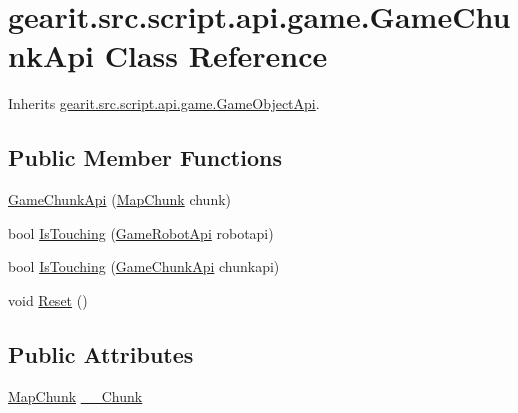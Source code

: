 \hypertarget{classgearit_1_1src_1_1script_1_1api_1_1game_1_1_game_chunk_api}{\section{gearit.\+src.\+script.\+api.\+game.\+Game\+Chunk\+Api Class Reference}
\label{classgearit_1_1src_1_1script_1_1api_1_1game_1_1_game_chunk_api}
}


Inherits \hyperlink{classgearit_1_1src_1_1script_1_1api_1_1game_1_1_game_object_api}{gearit.\+src.\+script.\+api.\+game.\+Game\+Object\+Api}.

\subsection*{Public Member Functions}
\begin{DoxyCompactItemize}
\item 
\hyperlink{classgearit_1_1src_1_1script_1_1api_1_1game_1_1_game_chunk_api_a205987f87ffa1c32e7c16c9f588b861d}{Game\+Chunk\+Api} (\hyperlink{classgearit_1_1src_1_1editor_1_1map_1_1_map_chunk}{Map\+Chunk} chunk)
\item 
bool \hyperlink{classgearit_1_1src_1_1script_1_1api_1_1game_1_1_game_chunk_api_ab3ab082bd06d93b442590f9d31e06f68}{Is\+Touching} (\hyperlink{classgearit_1_1src_1_1script_1_1api_1_1game_1_1_game_robot_api}{Game\+Robot\+Api} robotapi)
\item 
bool \hyperlink{classgearit_1_1src_1_1script_1_1api_1_1game_1_1_game_chunk_api_a3af6cb5a95e0cfab7453c7b6703c178a}{Is\+Touching} (\hyperlink{classgearit_1_1src_1_1script_1_1api_1_1game_1_1_game_chunk_api}{Game\+Chunk\+Api} chunkapi)
\item 
void \hyperlink{classgearit_1_1src_1_1script_1_1api_1_1game_1_1_game_chunk_api_a1446e34a9084a7169adef4fed911cd46}{Reset} ()
\end{DoxyCompactItemize}
\subsection*{Public Attributes}
\begin{DoxyCompactItemize}
\item 
\hyperlink{classgearit_1_1src_1_1editor_1_1map_1_1_map_chunk}{Map\+Chunk} \hyperlink{classgearit_1_1src_1_1script_1_1api_1_1game_1_1_game_chunk_api_a96f2b05dafcfea260390da98a40b46d8}{\+\_\+\+\_\+\+Chunk}
\end{DoxyCompactItemize}
